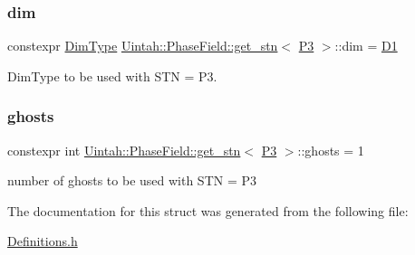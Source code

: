 \subsubsection{\texorpdfstring{dim}{dim}}
{\footnotesize\ttfamily constexpr \hyperlink{namespaceUintah_1_1PhaseField_a12bfc68444894dffdf0cb8d9cf0cc76a}{Dim\+Type} \hyperlink{structUintah_1_1PhaseField_1_1get__stn}{Uintah\+::\+Phase\+Field\+::get\+\_\+stn}$<$ \hyperlink{namespaceUintah_1_1PhaseField_a24d833a720598df1020f5cc2e75f8702a4f237510ae9624ab7568055802b586c6}{P3} $>$\+::dim = \hyperlink{namespaceUintah_1_1PhaseField_a12bfc68444894dffdf0cb8d9cf0cc76aa24dcc0ba6bcb45bc6f503b1b538c6809}{D1}\hspace{0.3cm}{\ttfamily [static]}}



Dim\+Type to be used with S\+TN = P3. 

\mbox{\label{structUintah_1_1PhaseField_1_1get__stn_3_01P3_01_4_a87bd650f62b718e5a353eb64ed5309b6}} 
\subsubsection{\texorpdfstring{ghosts}{ghosts}}
{\footnotesize\ttfamily constexpr int \hyperlink{structUintah_1_1PhaseField_1_1get__stn}{Uintah\+::\+Phase\+Field\+::get\+\_\+stn}$<$ \hyperlink{namespaceUintah_1_1PhaseField_a24d833a720598df1020f5cc2e75f8702a4f237510ae9624ab7568055802b586c6}{P3} $>$\+::ghosts = 1\hspace{0.3cm}{\ttfamily [static]}}



number of ghosts to be used with S\+TN = P3 



The documentation for this struct was generated from the following file\+:\begin{DoxyCompactItemize}
\item 
\hyperlink{Definitions_8h}{Definitions.\+h}\end{DoxyCompactItemize}
